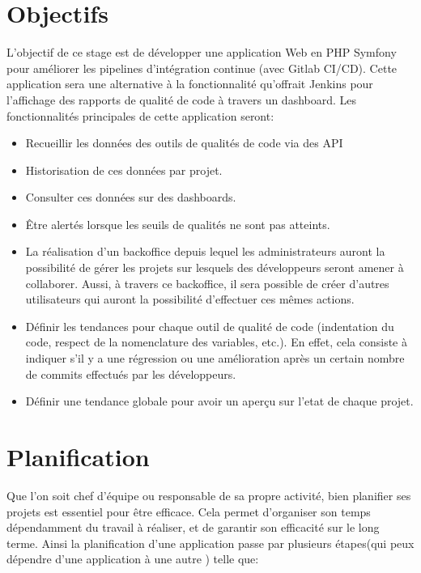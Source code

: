 	\section{Objectifs}
	L’objectif de ce stage est de développer une application Web en PHP Symfony pour améliorer les pipelines d’intégration continue (avec Gitlab CI/CD). Cette application sera une alternative à la fonctionnalité qu'offrait Jenkins pour l'affichage des rapports de qualité de code à travers un dashboard. Les fonctionnalités principales de cette application seront:
	\begin{itemize}
		\item Recueillir les données des outils de qualités de code via des API
		\item Historisation de ces données par projet.
		\item Consulter ces données sur des dashboards.
		\item Être alertés lorsque les seuils de qualités ne sont pas atteints.
		\item La réalisation d'un backoffice depuis lequel les administrateurs auront la possibilité de gérer les projets sur lesquels des développeurs seront amener à collaborer. Aussi, à travers ce backoffice, il sera possible de créer d'autres utilisateurs qui auront la possibilité d'effectuer ces mêmes actions.
		\item  Définir les tendances pour chaque outil de qualité de code (indentation du code, respect de la nomenclature des variables, etc.). En effet, cela consiste à indiquer s'il y a une régression ou une amélioration après un certain nombre de commits effectués par les développeurs.
		\item Définir une tendance globale pour avoir un aperçu sur l'etat de chaque projet.
	\end{itemize}

	\section{Planification}
	Que l’on soit chef d’équipe ou responsable de sa propre activité, bien planifier ses projets est essentiel pour être efficace. Cela permet d’organiser son temps dépendamment du travail à réaliser, et de garantir son efficacité sur le long terme. Ainsi la planification d'une application passe par plusieurs étapes(qui peux dépendre d'une application à une autre ) telle que:\\
	
